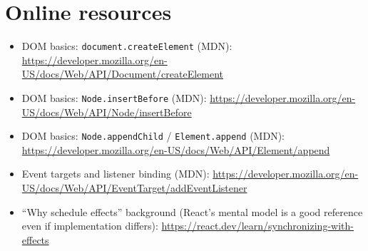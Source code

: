 \section{Online resources}
\begin{itemize}
  \item DOM basics: \texttt{document.createElement} (MDN): \href{https://developer.mozilla.org/en-US/docs/Web/API/Document/createElement}{https://developer.mozilla.org/en-US/docs/Web/API/Document/createElement}
  \item DOM basics: \texttt{Node.insertBefore} (MDN): \href{https://developer.mozilla.org/en-US/docs/Web/API/Node/insertBefore}{https://developer.mozilla.org/en-US/docs/Web/API/Node/insertBefore}
  \item DOM basics: \texttt{Node.appendChild} / \texttt{Element.append} (MDN): \href{https://developer.mozilla.org/en-US/docs/Web/API/Element/append}{https://developer.mozilla.org/en-US/docs/Web/API/Element/append}
  \item Event targets and listener binding (MDN): \href{https://developer.mozilla.org/en-US/docs/Web/API/EventTarget/addEventListener}{https://developer.mozilla.org/en-US/docs/Web/API/EventTarget/addEventListener}
  \item ``Why schedule effects'' background (React's mental model is a good reference even if implementation differs): \href{https://react.dev/learn/synchronizing-with-effects}{https://react.dev/learn/synchronizing-with-effects}
\end{itemize}
